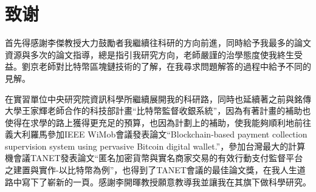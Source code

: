  
\chapter{致谢}
首先得感謝李傑教授大力鼓勵者我繼續往科研的方向前進，同時給予我最多的論文資源與多次的論文指導，總是指引我研究方向，老師嚴謹的治學態度使我終生受益。劉京老師對比特幣區塊鏈技術的了解，在我尋求問題解答的過程中給予不同的見解。

在實習單位中央研究院資訊科學所繼續展開我的科研路，同時也延續著之前與銘傳大學王家輝老師合作的科技部計畫“比特幣監督收銀系統”，因為有著計畫的補助也使得在求學的路上獲得更充足的預算，也因為計劃上的補助，使我能夠順利地前往義大利羅馬參加IEEE WiMob會議發表論文“Blockchain-based payment collection supervision system using pervasive Bitcoin digital wallet.”\supercite{Blockchain-basedpaymentcollectionsupervisionsystemusingpervasiveBitcoindigitalwallet}，參加台灣最大的計算機會議TANET發表論文“匿名加密貨幣與實名商家交易的有效行動支付監督平台之建置與實作-以比特幣為例”，也得到了TANET會議的最佳論文獎，在我人生道路中寫下了嶄新的一頁。感謝李開暉教授願意教導我並讓我在其旗下做科學研究。